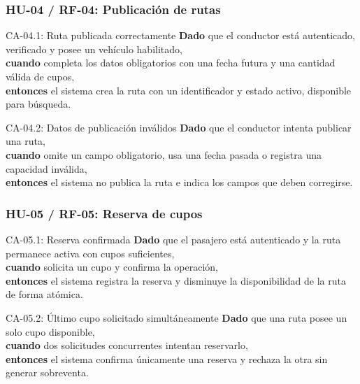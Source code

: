 \documentclass[12pt,a4paper]{article}
\begin{document}
\subsubsection{HU-04 / RF-04: Publicación de rutas}

\begin{GherkinBox}{CA-04.1: Ruta publicada correctamente}
\textbf{Dado} que el conductor está autenticado, verificado y posee un vehículo habilitado,\\
\textbf{cuando} completa los datos obligatorios con una fecha futura y una cantidad válida de cupos,\\
\textbf{entonces} el sistema crea la ruta con un identificador y estado activo, disponible para búsqueda.
\end{GherkinBox}

\begin{GherkinBox}{CA-04.2: Datos de publicación inválidos}
\textbf{Dado} que el conductor intenta publicar una ruta,\\
\textbf{cuando} omite un campo obligatorio, usa una fecha pasada o registra una capacidad inválida,\\
\textbf{entonces} el sistema no publica la ruta e indica los campos que deben corregirse.
\end{GherkinBox}

\subsubsection{HU-05 / RF-05: Reserva de cupos}

\begin{GherkinBox}{CA-05.1: Reserva confirmada}
\textbf{Dado} que el pasajero está autenticado y la ruta permanece activa con cupos suficientes,\\
\textbf{cuando} solicita un cupo y confirma la operación,\\
\textbf{entonces} el sistema registra la reserva y disminuye la disponibilidad de la ruta de forma atómica.
\end{GherkinBox}

\begin{GherkinBox}{CA-05.2: Último cupo solicitado simultáneamente}
\textbf{Dado} que una ruta posee un solo cupo disponible,\\
\textbf{cuando} dos solicitudes concurrentes intentan reservarlo,\\
\textbf{entonces} el sistema confirma únicamente una reserva y rechaza la otra sin generar sobreventa.
\end{GherkinBox}
\end{document}
